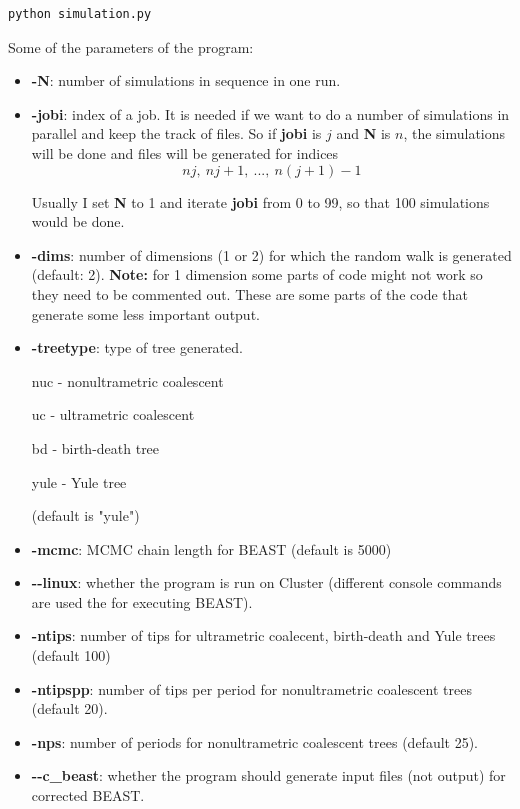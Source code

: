\begin{verbatim}
python simulation.py 
\end{verbatim}

Some of the parameters of the program:

\begin{itemize}
\item \textbf{-N}: number of simulations in sequence in one run.
\item \textbf{-jobi}: index of a job. It is needed if we want to do a number of simulations in parallel and keep the track of files. So if \textbf{jobi} is $j$ and \textbf{N} is $n$, the simulations will be done and files will be generated for indices
$$nj, \ nj+1, \ ... , \ n(j+1) - 1$$ 

Usually I set \textbf{N} to 1 and iterate \textbf{jobi} from 0 to 99, so that 100 simulations would be done.


\item \textbf{-dims}: number of dimensions (1 or 2) for which the random walk is generated (default: 2). \textbf{Note:} for 1 dimension some parts of code might not work so they need to be commented out. These are some parts of the code that generate some less important output.

\item \textbf{-treetype}: type of tree generated.

nuc - nonultrametric coalescent

uc - ultrametric coalescent

bd - birth-death tree

yule - Yule tree

(default is "yule")
\item \textbf{-mcmc}: MCMC chain length for BEAST (default is 5000)

\item \textbf{-{}-linux}: whether the program is run on Cluster (different console commands are used the for executing BEAST).

\item \textbf{-ntips}: number of tips for ultrametric coalecent, birth-death and Yule trees (default 100)

\item \textbf{-ntipspp}: number of tips per period for nonultrametric coalescent trees (default 20).

\item \textbf{-nps}: number of periods for nonultrametric coalescent trees (default 25).

\item \textbf{-{}-c\_beast}: whether the program should generate input files (not output) for corrected BEAST.


\end{itemize}

